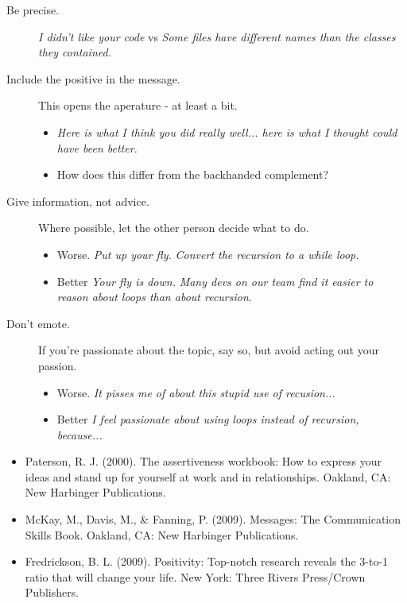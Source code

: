 \documentclass{article}
\begin{document}
\begin{tiny}
\begin{multicols}{3}
\begin{tcolorbox}
\begin{description}
            \item[Be precise.] \emph{I didn't like your code} vs \emph{Some files have different names than the classes they contained.}
            \item[Include the positive in the message.] This opens the aperature - at least a bit.
                \begin{itemize}
                    \item \emph{Here is what I think you did really well... here is what I thought could have been better.}
                    \item How does this differ from the backhanded complement?
                \end{itemize}
            \item[Give information, not advice.] Where possible, let the other person decide what to do.
                \begin{itemize}
                    \item Worse. \emph{Put up your fly.} \emph{Convert the recursion to a while loop.}
                    \item Better \emph{Your fly is down.} \emph{Many devs on our team find it easier to reason about loops than about recursion.}
                \end{itemize}
            \item[Don't emote.] If you're passionate about the topic, say so, but avoid acting out your passion.
                \begin{itemize}
                    \item Worse. \emph{It pisses me of about this stupid use of recusion...}
                    \item Better \emph{I feel passionate about using loops instead of recursion, because...}
                \end{itemize}
        \end{description}

    \end{tcolorbox}

\end{multicols}

\begin{itemize}
    \item Paterson, R. J. (2000). The assertiveness workbook: How to express your ideas and stand up for yourself at work and in relationships. Oakland, CA: New Harbinger Publications.
    \item McKay, M., Davis, M., \& Fanning, P. (2009). Messages: The Communication Skills Book. Oakland, CA: New Harbinger Publications.
    \item Fredrickson, B. L. (2009). Positivity: Top-notch research reveals the 3-to-1 ratio that will change your life. New York: Three Rivers Press/Crown Publishers.
\end{itemize}

\end{tiny}
\end{document}
